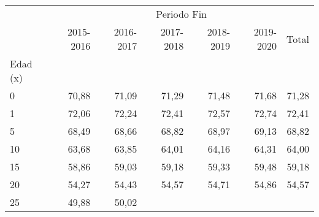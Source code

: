 \begin{tabular}{lllllll}
\cline{1-7}
\multicolumn{1}{c}{} &
  \multicolumn{6}{|c}{Periodo Fin} \\
\multicolumn{1}{c}{} &
  \multicolumn{1}{|r}{2015-2016} &
  \multicolumn{1}{r}{2016-2017} &
  \multicolumn{1}{r}{2017-2018} &
  \multicolumn{1}{r}{2018-2019} &
  \multicolumn{1}{r}{2019-2020} &
  \multicolumn{1}{r}{Total} \\
\cline{1-7}
\multicolumn{1}{l}{Edad (x)} &
  \multicolumn{1}{|r}{} &
  \multicolumn{1}{r}{} &
  \multicolumn{1}{r}{} &
  \multicolumn{1}{r}{} &
  \multicolumn{1}{r}{} &
  \multicolumn{1}{r}{} \\
\multicolumn{1}{l}{\hspace{1em}0} &
  \multicolumn{1}{|r}{70,88} &
  \multicolumn{1}{r}{71,09} &
  \multicolumn{1}{r}{71,29} &
  \multicolumn{1}{r}{71,48} &
  \multicolumn{1}{r}{71,68} &
  \multicolumn{1}{r}{71,28} \\
\multicolumn{1}{l}{\hspace{1em}1} &
  \multicolumn{1}{|r}{72,06} &
  \multicolumn{1}{r}{72,24} &
  \multicolumn{1}{r}{72,41} &
  \multicolumn{1}{r}{72,57} &
  \multicolumn{1}{r}{72,74} &
  \multicolumn{1}{r}{72,41} \\
\multicolumn{1}{l}{\hspace{1em}5} &
  \multicolumn{1}{|r}{68,49} &
  \multicolumn{1}{r}{68,66} &
  \multicolumn{1}{r}{68,82} &
  \multicolumn{1}{r}{68,97} &
  \multicolumn{1}{r}{69,13} &
  \multicolumn{1}{r}{68,82} \\
\multicolumn{1}{l}{\hspace{1em}10} &
  \multicolumn{1}{|r}{63,68} &
  \multicolumn{1}{r}{63,85} &
  \multicolumn{1}{r}{64,01} &
  \multicolumn{1}{r}{64,16} &
  \multicolumn{1}{r}{64,31} &
  \multicolumn{1}{r}{64,00} \\
\multicolumn{1}{l}{\hspace{1em}15} &
  \multicolumn{1}{|r}{58,86} &
  \multicolumn{1}{r}{59,03} &
  \multicolumn{1}{r}{59,18} &
  \multicolumn{1}{r}{59,33} &
  \multicolumn{1}{r}{59,48} &
  \multicolumn{1}{r}{59,18} \\
\multicolumn{1}{l}{\hspace{1em}20} &
  \multicolumn{1}{|r}{54,27} &
  \multicolumn{1}{r}{54,43} &
  \multicolumn{1}{r}{54,57} &
  \multicolumn{1}{r}{54,71} &
  \multicolumn{1}{r}{54,86} &
  \multicolumn{1}{r}{54,57} \\
\multicolumn{1}{l}{\hspace{1em}25} &
  \multicolumn{1}{|r}{49,88} &
  \multicolumn{1}{r}{50,02} &

\end{tabular}
